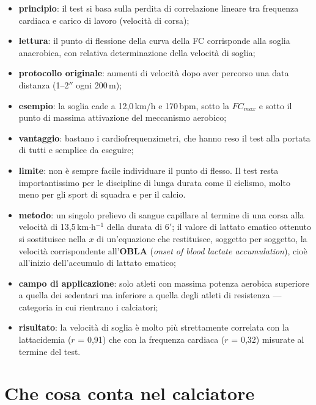 \begin{itemize}
  \item \textbf{principio}: il test si basa sulla perdita di correlazione lineare tra frequenza
    cardiaca e carico di lavoro (velocità di corsa);
  \item \textbf{lettura}: il punto di flessione della curva della FC corrisponde alla soglia
    anaerobica, con relativa determinazione della velocità di soglia;
  \item \textbf{protocollo originale}: aumenti di velocità dopo aver percorso una data distanza
    (1--2$''$ ogni 200\,m);
  \item \textbf{esempio}: la soglia cade a 12,0\,km/h e 170\,bpm, sotto la $FC_{max}$ e sotto il
    punto di massima attivazione del meccanismo aerobico;
  \item \textbf{vantaggio}: bastano i cardiofrequenzimetri, che hanno reso il test alla portata di
    tutti e semplice da eseguire;
  \item \textbf{limite}: non è sempre facile individuare il punto di flesso. Il test resta
    importantissimo per le discipline di lunga durata come il ciclismo, molto meno per gli sport di
    squadra e per il calcio.
\end{itemize}

\begin{itemize}
  \item \textbf{metodo}: un singolo prelievo di sangue capillare al termine di una corsa alla
    velocità di 13,5\,km$\cdot$h$^{-1}$ della durata di 6$'$; il valore di lattato ematico ottenuto
    si sostituisce nella $x$ di un'equazione che restituisce, soggetto per soggetto, la velocità
    corrispondente all'\textbf{OBLA} (\textit{onset of blood lactate accumulation}), cioè all'inizio
    dell'accumulo di lattato ematico;
  \item \textbf{campo di applicazione}: solo atleti con massima potenza aerobica superiore a quella
    dei sedentari ma inferiore a quella degli atleti di resistenza --- categoria in cui rientrano i
    calciatori;
  \item \textbf{risultato}: la velocità di soglia è molto più strettamente correlata con la
    lattacidemia ($r$ = 0,91) che con la frequenza cardiaca ($r$ = 0,32) misurate al termine del
    test.
\end{itemize}

\section{Che cosa conta nel calciatore}

